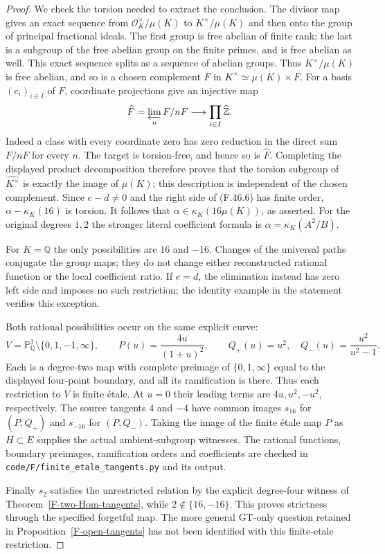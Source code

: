 \documentclass[11pt,oneside]{article}
\begin{document}
\begin{proof}
We check the torsion needed to extract the conclusion.
The divisor map gives an exact sequence from
$\mathcal O_K^\times/\mu(K)$ to $K^\times/\mu(K)$ and then
onto the group of principal fractional ideals. The first
group is free abelian of finite rank; the last is a subgroup
of the free abelian group on the finite primes, and is free
abelian as well. This exact sequence splits as a sequence of
abelian groups. Thus $K^\times/\mu(K)$ is free abelian, and
so is a chosen complement $F$ in
$K^\times\simeq\mu(K)\times F$. For a basis $(e_i)_{i\in I}$
of $F$, coordinate projections give an injective map
\[
       \widehat F=\varprojlim_n F/nF
              \longrightarrow\prod_{i\in I}\widehat{\mathbb Z}.
\]
Indeed a class with every coordinate zero has zero reduction
in the direct sum $F/nF$ for every $n$. The target is
torsion-free, and hence so is $\widehat F$. Completing the
displayed product decomposition therefore proves that the
torsion subgroup of $\widehat{K^\times}$ is exactly the image
of $\mu(K)$; this description is independent of the chosen
complement. Since $e-d\ne0$ and the right side of (F.46.6)
has finite order, $\alpha-\kappa_K(16)$ is torsion. It follows
that $\alpha\in\kappa_K(16\mu(K))$, as asserted. For the
original degrees $1,2$ the stronger literal coefficient
formula is $\alpha=\kappa_K(A^2/B)$.

For $K=\mathbb Q$ the only possibilities are $16$ and $-16$.
Changes of the universal paths conjugate the group maps; they
do not change either reconstructed rational function or the
local coefficient ratio. If $e=d$, the elimination instead
has zero left side and imposes no such restriction; the
identity example in the statement verifies this exception.

Both rational possibilities occur on the same explicit curve:
\[
 V=\mathbb P^1_{\mathbb Q}\setminus\{0,1,-1,\infty\},
 \qquad P(u)=\frac{4u}{(1+u)^2},\qquad
 Q_+(u)=u^2,\quad Q_-(u)=\frac{u^2}{u^2-1}.
 \tag{F.46.7}
\]
Each is a degree-two map with complete preimage of
$\{0,1,\infty\}$ equal to the displayed four-point boundary,
and all its ramification is there. Thus each restriction to
$V$ is finite \'etale. At $u=0$ their leading terms are
$4u,u^2,-u^2$, respectively. The source tangents $4$ and $-4$
have common images $s_{16}$ for $(P,Q_+)$ and $s_{-16}$ for
$(P,Q_-)$. Taking the image of the finite \'etale map $P$
as $H\subset E$ supplies the actual ambient-subgroup witnesses.
The rational functions, boundary preimages, ramification orders
and coefficients are checked in
\texttt{code/F/finite\_etale\_tangents.py} and its output.

Finally $s_2$ satisfies the unrestricted relation by the explicit
degree-four witness of Theorem~\ref{F-two-Hom-tangents}, while
$2\notin\{16,-16\}$. This proves strictness through the
specified forgetful map. The more general GT-only question
retained in Proposition~\ref{F-open-tangents} has not been
identified with this finite-etale restriction.
\end{proof}
\end{document}
